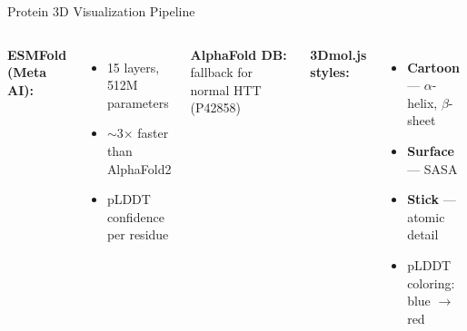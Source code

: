 \documentclass[aspectratio=169,11pt]{beamer}
\begin{document}
\begin{frame}{Protein 3D Visualization Pipeline}
    \begin{columns}[T]

        \textbf{ESMFold (Meta AI):}
        \begin{itemize}
            \item 15 layers, 512M parameters
            \item $\sim$3$\times$ faster than AlphaFold2
            \item pLDDT confidence per residue
        \end{itemize}
        \textbf{AlphaFold DB:} fallback for normal HTT (P42858)

        \textbf{3Dmol.js styles:}
        \begin{itemize}
            \item \textbf{Cartoon} --- $\alpha$-helix, $\beta$-sheet
            \item \textbf{Surface} --- SASA
            \item \textbf{Stick} --- atomic detail
            \item pLDDT coloring: blue $\to$ red
        \end{itemize}
    \end{columns}
\end{frame}
\end{document}

